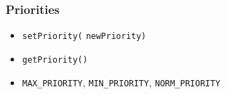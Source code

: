 \documentclass{article}
\begin{document}
\subsubsection{Priorities}
\begin{itemize}
\item {}  {\tt setPriority(} {\tt newPriority)}
\item {} {\tt getPriority()}
\item {\tt MAX\_PRIORITY}, {\tt MIN\_PRIORITY}, {\tt NORM\_PRIORITY}
\end{itemize}
\end{document}
